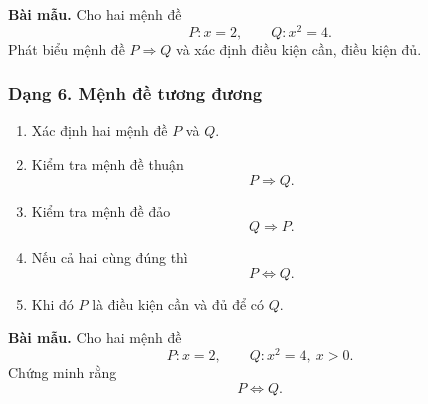 \begin{vidumau}

\textbf{Bài mẫu.} Cho hai mệnh đề
\[
P\colon x=2,
\qquad
Q\colon x^2=4.
\]
Phát biểu mệnh đề $P\Rightarrow Q$ và xác định điều kiện cần, điều kiện đủ.

\end{vidumau}


\subsubsection{Dạng 6. Mệnh đề tương đương}

\begin{phuongphap}
\begin{enumerate}
	\item Xác định hai mệnh đề $P$ và $Q$.
	\item Kiểm tra mệnh đề thuận
	\[
	P\Rightarrow Q.
	\]
	\item Kiểm tra mệnh đề đảo
	\[
	Q\Rightarrow P.
	\]
	\item Nếu cả hai cùng đúng thì
	\[
	P\Leftrightarrow Q.
	\]
	\item Khi đó $P$ là điều kiện cần và đủ để có $Q$.
\end{enumerate}
\end{phuongphap}

\begin{vidumau}

\textbf{Bài mẫu.} Cho hai mệnh đề
\[
P\colon x=2,
\qquad
Q\colon x^2=4,\ x>0.
\]
Chứng minh rằng
\[
P\Leftrightarrow Q.
\]

\end{vidumau}


